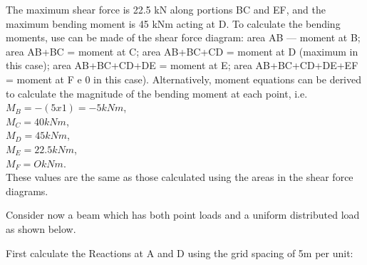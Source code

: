 \documentclass[12pt, letterpaper, twoside]{article}
\begin{document}
\bigskip


The maximum shear force is 22.5 kN along portions BC and EF, and the maximum bending moment is 45 kNm acting at D.
To calculate the bending moments, use can be made of the shear force diagram: area AB — moment at B; area AB+BC = moment at C; area AB+BC+CD = moment at D (maximum in this case); area AB+BC+CD+DE = moment at E; area AB+BC+CD+DE+EF = moment at F e 0 in this case).
Alternatively, moment equations can be derived to calculate the magnitude of the bending moment at each point, i.e.\\
$M_B = -(5x1) = -5 kNm$,\\
$M_C =  40 kNm$,\\
$M_D =  45 kNm$,\\
$M_E =  22.5 kNm$,\\
$M_F =  O kNm$.\\
These values are the same as those calculated using the areas in the shear force diagrams.


\bigskip
Consider now a beam which has both point loads and a uniform distributed load as shown below.
 
\begin{center}
\end{center}
 
 
\bigskip
 First calculate the Reactions at A and D using the grid spacing of 5m per unit:
 
\end{document}

